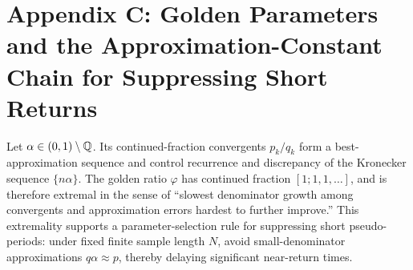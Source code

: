 ﻿\section{Appendix C: Golden Parameters and the Approximation-Constant Chain for Suppressing Short Returns}
\label{app:golden-approx}

Let $\alpha\in(0,1)\setminus\mathbb{Q}$. Its continued-fraction convergents $p_k/q_k$ form a best-approximation sequence and control recurrence and discrepancy of the Kronecker sequence $\{n\alpha\}$. The golden ratio $\varphi$ has continued fraction $[1;1,1,\dots]$, and is therefore extremal in the sense of ``slowest denominator growth among convergents and approximation errors hardest to further improve.'' This extremality supports a parameter-selection rule for suppressing short pseudo-periods: under fixed finite sample length $N$, avoid small-denominator approximations $q\alpha\approx p$, thereby delaying significant near-return times.
